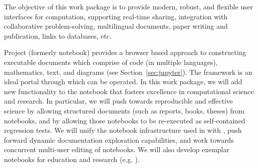 \begin{draft}
\end{draft}

\begin{workpackage}[id=UI,wphases=0-48,
  title=User Interfaces,
  lead=SR,
  PSRM=12,  %
  UVRM=2,   %
  JURM=4,  %
  FAURM=8, %
  USHRM=6, %
  LLRM=12, %
  SARM=18, %
  UKRM=2, %
  UBRM=28,  %
  USORM=11, %
  XFELRM=5, %
  SRRM=28,
  UGRM=14,
  USRM=4, %
  swsites]    %

\begin{wpobjectives}
  The objective of this work package is to provide modern, robust,
  and flexible user interfaces for computation, supporting real-time
  sharing, integration with collaborative problem-solving,
  multilingual documents, paper writing and publication, links to
  databases, etc.
\end{wpobjectives}

\begin{wpdescription}
  Project \Jupyter (formerly \IPython notebook) provides a browser
  based approach to constructing executable documents which comprise
  of code (in multiple languages), mathematics, text, and diagrams (see
  Section~\ref{sec:jupyter}). The
  framework is an ideal portal through which \VREs can be operated. In
  this work package, we will add new functionality to the \Jupyter
  notebook that fosters excellence in computational science and
  research. In particular, we will push towards reproducible and
  effective science by allowing structured documents (such as reports,
  books, theses) from notebooks, and by allowing those notebooks to be
  re-executed as self-contained regression tests. We will unify the
  notebook infrastructure used in \Sage with \Jupyter, push forward
  dynamic documentation exploration capabilities, and work towards
  concurrent multi-user editing of notebooks. We will also develop
  exemplar \Jupyter notebooks for education and research
  (e.g. ).


\end{wpdescription}
\end{workpackage}
